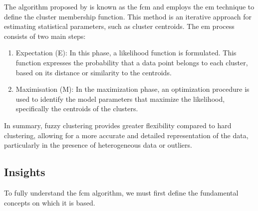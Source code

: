 \noindent The algorithm proposed by \citep{FuzzyClustering_developDoc} is known as the \gls{fcm} and employs the \gls{em} technique to define the cluster membership function. This method is an iterative approach for estimating statistical parameters, such as cluster centroids. The \gls{em} process consists of two main steps:
\begin{enumerate}
    \item Expectation (E): In this phase, a likelihood function is formulated. This function expresses the probability that a data point belongs to each cluster, based on its distance or similarity to the centroids.
    \item Maximisation (M): In the maximization phase, an optimization procedure is used to identify the model parameters that maximize the likelihood, specifically the centroids of the clusters.
\end{enumerate}

\noindent In summary, fuzzy clustering provides greater flexibility compared to hard clustering, allowing for a more accurate and detailed representation of the data, particularly in the presence of heterogeneous data or outliers.

\subsection{Insights}
To fully understand the \gls{fcm} algorithm, we must first define the fundamental concepts on which it is based.

